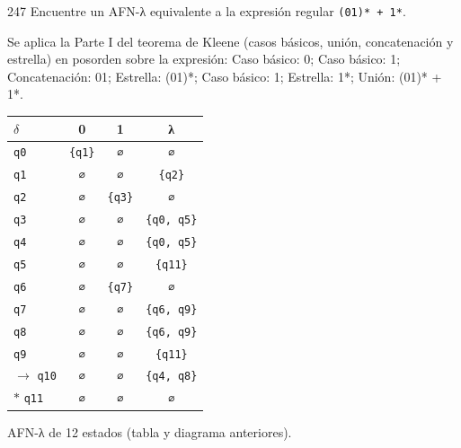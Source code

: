 \documentclass[11pt]{article}
\begin{document}
\begin{ejercicio}{247}{}
Encuentre un AFN-λ equivalente a la expresión regular \texttt{(01)* + 1*}.
\end{ejercicio}
\proc Se aplica la Parte I del teorema de Kleene (casos básicos, unión, concatenación y estrella) en posorden sobre la expresión: Caso básico: 0; Caso básico: 1; Concatenación: 01; Estrella: (01)*; Caso básico: 1; Estrella: 1*; Unión: (01)* + 1*.
\begin{center}\small\begin{tabular}{lccc}\toprule
$\delta$ & 0 & 1 & λ \\\midrule
 \texttt{q0} & \texttt{\{q1\}} & \texttt{∅} & \texttt{∅} \\
 \texttt{q1} & \texttt{∅} & \texttt{∅} & \texttt{\{q2\}} \\
 \texttt{q2} & \texttt{∅} & \texttt{\{q3\}} & \texttt{∅} \\
 \texttt{q3} & \texttt{∅} & \texttt{∅} & \texttt{\{q0, q5\}} \\
 \texttt{q4} & \texttt{∅} & \texttt{∅} & \texttt{\{q0, q5\}} \\
 \texttt{q5} & \texttt{∅} & \texttt{∅} & \texttt{\{q11\}} \\
 \texttt{q6} & \texttt{∅} & \texttt{\{q7\}} & \texttt{∅} \\
 \texttt{q7} & \texttt{∅} & \texttt{∅} & \texttt{\{q6, q9\}} \\
 \texttt{q8} & \texttt{∅} & \texttt{∅} & \texttt{\{q6, q9\}} \\
 \texttt{q9} & \texttt{∅} & \texttt{∅} & \texttt{\{q11\}} \\
$\to$ \texttt{q10} & \texttt{∅} & \texttt{∅} & \texttt{\{q4, q8\}} \\
$*$ \texttt{q11} & \texttt{∅} & \texttt{∅} & \texttt{∅} \\
\bottomrule\end{tabular}\end{center}

\resp AFN-λ de 12 estados (tabla y diagrama anteriores).
\end{document}
